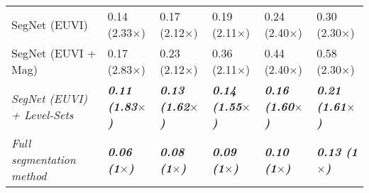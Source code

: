 \begin{table*}[!t]
\begin{tabular}{p{5cm} p{2cm} p{2cm} p{2cm} p{2cm} p{2cm}}
		SegNet (EUVI) & 0.14 (2.33$\times$) & 0.17 (2.12$\times$) & 0.19 (2.11$\times$) & 0.24 (2.40$\times$) & 0.30 (2.30$\times$) \\[0.01cm] %
		SegNet (EUVI + Mag) & 0.17 (2.83$\times$) & 0.23 (2.12$\times$) & 0.36 (2.11$\times$) & 0.44 (2.40$\times$) & 0.58 (2.30$\times$) \\[0.01cm]
		\textit{SegNet (EUVI) + Level-Sets} & \textbf{\textit{0.11 (1.83$\times$)}} & \textbf{\textit{0.13 (1.62$\times$)}} & \textbf{\textit{0.14 (1.55$\times$)}} & \textbf{\textit{0.16 (1.60$\times$)}} & \textit{\textbf{0.21 (1.61$\times$)}}\\[0.2cm]
		
		\textit{Full segmentation method} & \textbf{\textit{0.06 (1$\times$)}} & \textbf{\textit{0.08 (1$\times$)}} & \textbf{\textit{0.09 (1$\times$)}} & \textbf{\textit{0.10 (1$\times$)}} & \textbf{\textit{0.13 
				(1$\times$)}} \\
		\bottomrule
	\end{tabular}
\end{table*}
